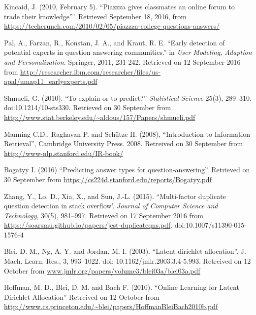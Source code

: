 \documentclass[journal,12pt,onecolumn,draftclsnofoot,]{IEEEtran}
\begin{document}
\begin{thebibliography}{1}

  
Kincaid, J. (2010, February 5). ``Piazzza gives classmates an online forum to trade their knowledge'''. Retrieved September 18, 2016, from \url{https://techcrunch.com/2010/02/05/piazzza-college-questions-answers/}

Pal, A., Farzan, R., Konstan, J. A., and Kraut, R. E. ``Early detection of potential experts in question answering communities.'' in \emph{User Modeling, Adaption and Personalization}. Springer, 2011, 231-242. Retrieved on 12 September 2016 from \url{http://researcher.ibm.com/researcher/files/us-apal/umap11_earlyexperts.pdf}

Shmueli, G. (2010). ``To explain or to predict?'' \emph{Statistical Science} 25(3), 289–310. doi:10.1214/10-sts330. Retrieved on 30 September from \url{http://www.stat.berkeley.edu/~aldous/157/Papers/shmueli.pdf}

Manning C.D., Raghavan P. and Schütze H. (2008), ``Introduction to Information Retrieval'', Cambridge University Press. 2008. Retreived on 30 September from \url{http://www-nlp.stanford.edu/IR-book/}

Bogatyy I. (2016) ``Predicting answer types for question-answering''. Retrieved on 30 September from \url{https://cs224d.stanford.edu/reports/Bogatyy.pdf}

Zhang, Y., Lo, D., Xia, X., and Sun, J.-L. (2015). ``Multi-factor duplicate question detection in stack overflow'. \emph{Journal of Computer Science and Technology}, 30(5), 981–997. Retrieved on 17 September 2016 from \url{https://soarsmu.github.io/papers/jcst-duplicateqns.pdf}.  doi:10.1007/s11390-015-1576-4

Blei, D. M., Ng, A. Y. and Jordan, M. I. (2003). ``Latent dirichlet allocation''. J. Mach. Learn. Res., 3, 993--1022. doi: 10.1162/jmlr.2003.3.4-5.993. Retreived on 12 October from \url{www.jmlr.org/papers/volume3/blei03a/blei03a.pdf}

Hoffman, M. D., Blei, D. M. and Bach F. (2010). ``Online Learning for Latent Dirichlet Allocation'' Retreived on 12 October from \url{http://www.cs.princeton.edu/~blei/papers/HoffmanBleiBach2010b.pdf}


\end{thebibliography}
\end{document}
